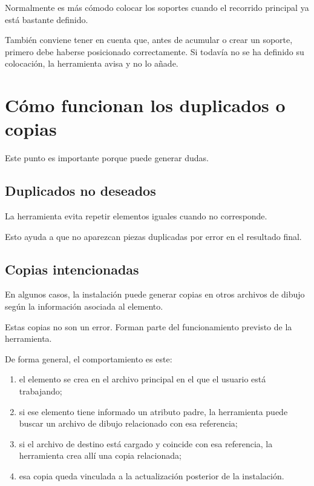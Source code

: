 Normalmente es más cómodo colocar los soportes cuando el recorrido principal ya está bastante definido.

También conviene tener en cuenta que, antes de acumular o crear un soporte, primero debe haberse posicionado correctamente. Si todavía no se ha definido su colocación, la herramienta avisa y no lo añade.


\section{Cómo funcionan los duplicados o copias}

Este punto es importante porque puede generar dudas.

\subsection{Duplicados no deseados}

La herramienta evita repetir elementos iguales cuando no corresponde.

Esto ayuda a que no aparezcan piezas duplicadas por error en el resultado final.

\subsection{Copias intencionadas}

En algunos casos, la instalación puede generar copias en otros archivos de dibujo según la información asociada al elemento.

Estas copias no son un error. Forman parte del funcionamiento previsto de la herramienta.

De forma general, el comportamiento es este:

\begin{enumerate}
\item el elemento se crea en el archivo principal en el que el usuario está trabajando;
\item si ese elemento tiene informado un atributo padre, la herramienta puede buscar un archivo de dibujo relacionado con esa referencia;
\item si el archivo de destino está cargado y coincide con esa referencia, la herramienta crea allí una copia relacionada;
\item esa copia queda vinculada a la actualización posterior de la instalación.
\end{enumerate}

